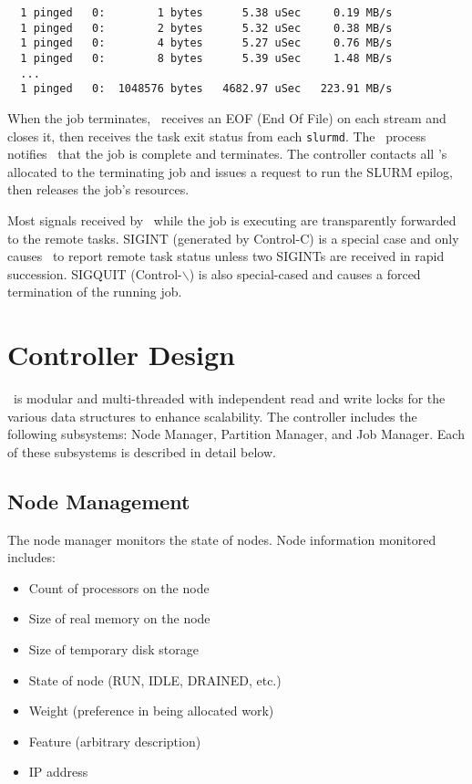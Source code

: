 \documentclass[10pt,onecolumn,times]{../common/llncs}
\begin{document}
{\begin{verbatim}
  1 pinged   0:        1 bytes      5.38 uSec     0.19 MB/s                     
  1 pinged   0:        2 bytes      5.32 uSec     0.38 MB/s                     
  1 pinged   0:        4 bytes      5.27 uSec     0.76 MB/s                     
  1 pinged   0:        8 bytes      5.39 uSec     1.48 MB/s                     
  ...
  1 pinged   0:  1048576 bytes   4682.97 uSec   223.91 MB/s              
\end{verbatim}

When the job terminates, \srun\ receives an EOF (End Of File) on each
stream and closes it, then receives the task exit status from each
{\tt slurmd}.  The \srun\ process notifies \slurmctld\ that the job is
complete and terminates. The controller contacts all \slurmd 's allocated
to the terminating job and issues a request to run the SLURM epilog,
then releases the job's resources.

Most signals received by \srun\ while the job is executing are 
transparently forwarded to the remote tasks. SIGINT (generated by
Control-C) is a special case and only causes \srun\ to report 
remote task status unless two SIGINTs are received in rapid succession.
SIGQUIT (Control-$\backslash$) is also special-cased and causes a forced
termination of the running job.

\section{Controller Design}

\slurmctld\ is modular and multi-threaded with independent read and
write locks for the various data structures to enhance scalability.
The controller includes the following subsystems: Node Manager, Partition
Manager, and Job Manager.  Each of these subsystems is described in
detail below.

\subsection{Node Management}

The node manager monitors the state of nodes.  Node information monitored
includes:

\begin{itemize}
\item Count of processors on the node
\item Size of real memory on the node
\item Size of temporary disk storage
\item State of node (RUN, IDLE, DRAINED, etc.)
\item Weight (preference in being allocated work)
\item Feature (arbitrary description)
\item IP address
\end{itemize}

}
\end{document}
